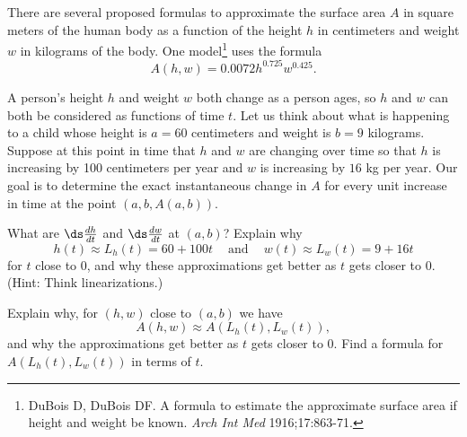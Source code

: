 \begin{pa} \label{PA:10.5} There are several proposed formulas to approximate the surface area $A$ in square meters of the human body as a function of the height $h$ in centimeters and weight $w$ in kilograms of the body. One model\footnote{DuBois D, DuBois DF. A formula to estimate the approximate surface area if height and weight be known.  \emph{Arch Int Med} 1916;17:863-71.} uses the formula
\[A(h,w) = 0.0072 h^{0.725}w^{0.425}.\]

A person's height $h$ and weight $w$ both change as a person ages, so $h$ and $w$ can both be considered as functions of time $t$. Let us think about what is happening to a child whose height is $a=60$ centimeters and weight is $b=9$ kilograms. Suppose at this point in time that $h$ and $w$ are changing over time so that $h$ is increasing by 100 centimeters per year and $w$ is increasing by $16$ kg per year. Our goal is to determine the exact instantaneous change in $A$ for every unit increase in time at the point $(a,b,A(a,b))$.
	\ba
    \item What are $\ds \frac{dh}{dt}$ and $\ds \frac{dw}{dt}$ at $(a,b)$? Explain why
\[h(t) \approx L_h(t) = 60+100t \ \ \ \ \text{ and } \ \ \ \ w(t) \approx L_w(t) = 9+16t\]
for $t$ close to $0$, and why these approximations get better as $t$ gets closer to 0. (Hint: Think linearizations.)



\begin{comment}

Recall that the linearization $L_f$ of a function $f=f(x)$ at the point where $x=c$ is
         \[L_f(x) = f(c) + f'(c)(x-c).\]
Since
\[\frac{dh}{dt}\biggm|_{(a,b)} = 100 \ \frac{\text{cm}}{\text{year}} \ \ \ \text{ and } \ \ \ \ \frac{dw}{dt}\biggm|_{(a,b)} = 16 \ \frac{\text{kg}}{\text{year}},\]
the linearization of $h$ when $h=60$ is $L_h(t) = 60+100t$ and the linearization of $w$ when $w=9$ is $L_w(t) = 9+16t$. Note that as $t \to 0$, we have $(L_h(t), L_w(t)) \to (a,b)$.
So for $t$ close to 0 (or, equivalently, $(h,w)$ close to $(a,b)$) we have
\[h(t) \approx L_h(t) = 60+100t \ \ \ \ \text{ and } \ \ \ \ w(t) \approx L_w(t) = 9+16t,\]
and the approximations get better as $t$ gets closer to 0.



\end{comment}

	\item Explain why, for $(h,w)$ close to $(a,b)$ we have
\[A(h,w) \approx A(L_h(t), L_w(t)),\]
and why the approximations get better as $t$ gets closer to 0. Find a formula for $A(L_h(t),L_w(t))$ in terms of $t$.




\end{pa}
